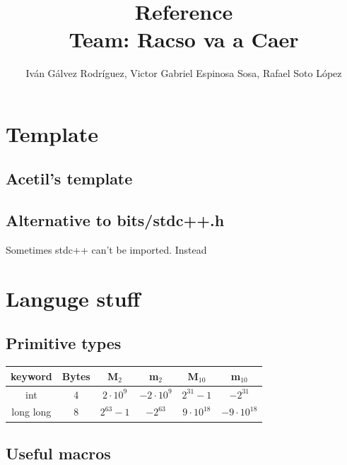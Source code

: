 \documentclass[a4paper,10pt,twocolumn, titlepage]{article}
\title{Reference \\ \small Team: Racso va a Caer}
\author{Iván Gálvez Rodríguez, Victor Gabriel Espinosa Sosa, Rafael Soto López}
\begin{document}
\maketitle

\tableofcontents

\vspace{1.5cm}

\section{Template}
\subsection{Acetil's template}



\subsection{Alternative to bits/stdc++.h}

Sometimes stdc++ can't be imported. Instead



\section{Languge stuff} %
\subsection{Primitive types}

\begin{center}
\begin{tabular}{ |c|c|c|c|c|c| }
 \hline
 \textbf{keyword} & \textbf{Bytes} & \textbf{M$_{2}$} & \textbf{m$_{2}$} & \textbf{M$_{10}$} & \textbf{m$_{10}$}\\
 \hline
 int & 4 & $2\cdot 10^9$ & $-2\cdot 10^9$ & $2^{31} - 1$ & $-2^{31}$ \\
 \hline
 long long & 8 & $2^{63} - 1$ & $-2^{63}$ & $9\cdot10^{18}$ & $-9\cdot10^{18}$ \\
 \hline
\end{tabular}
\end{center}

\subsection{Useful macros}
\end{document}
